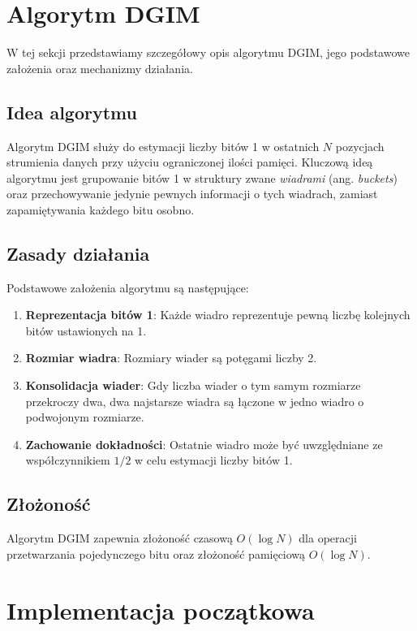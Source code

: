 \documentclass{article}
\begin{document}
\section{Algorytm DGIM}

W tej sekcji przedstawiamy szczegółowy opis algorytmu DGIM, jego podstawowe założenia oraz mechanizmy działania.

\subsection{Idea algorytmu}

Algorytm DGIM służy do estymacji liczby bitów 1 w ostatnich $N$ pozycjach strumienia danych przy użyciu ograniczonej ilości pamięci. Kluczową ideą algorytmu jest grupowanie bitów 1 w struktury zwane \textit{wiadrami} (ang. \textit{buckets}) oraz przechowywanie jedynie pewnych informacji o tych wiadrach, zamiast zapamiętywania każdego bitu osobno.

\subsection{Zasady działania}

Podstawowe założenia algorytmu są następujące:

\begin{enumerate}
    \item \textbf{Reprezentacja bitów 1}: Każde wiadro reprezentuje pewną liczbę kolejnych bitów ustawionych na 1.
    \item \textbf{Rozmiar wiadra}: Rozmiary wiader są potęgami liczby 2.
    \item \textbf{Konsolidacja wiader}: Gdy liczba wiader o tym samym rozmiarze przekroczy dwa, dwa najstarsze wiadra są łączone w jedno wiadro o podwojonym rozmiarze.
    \item \textbf{Zachowanie dokładności}: Ostatnie wiadro może być uwzględniane ze współczynnikiem $1/2$ w celu estymacji liczby bitów 1.
\end{enumerate}

\subsection{Złożoność}

Algorytm DGIM zapewnia złożoność czasową $O(\log N)$ dla operacji przetwarzania pojedynczego bitu oraz złożoność pamięciową $O(\log N)$.

\newpage

\section{Implementacja początkowa}
\end{document}
